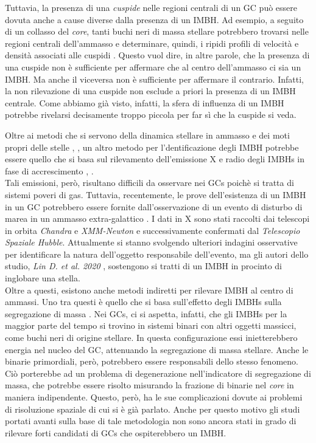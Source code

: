 Tuttavia, la presenza di una \textit{cuspide} nelle regioni centrali di un GC può essere dovuta anche a cause diverse dalla presenza di un IMBH. Ad esempio, a seguito di un collasso del \textit{core}, tanti buchi neri di massa stellare potrebbero trovarsi nelle regioni centrali dell'ammasso e determinare, quindi, i ripidi profili di velocità e densità associati alle cuspidi \cite{trenti:paper}. Questo vuol dire, in altre parole, che la presenza di una cuspide non è sufficiente per affermare che al centro dell'ammasso ci sia un IMBH. Ma anche il viceversa non è sufficiente per affermare il contrario. Infatti, la non rilevazione di una cuspide non esclude a priori la presenza di un IMBH centrale. Come abbiamo già visto, infatti, la sfera di influenza di un IMBH potrebbe rivelarsi decisamente troppo piccola per far sì che la cuspide si veda.

Oltre ai metodi che si servono della dinamica stellare in ammasso e dei moti propri delle stelle \cite{banwolf:paper}, \cite{gebh:paper}, un altro metodo per l'dentificazione degli IMBH potrebbe essere quello che si basa sul rilevamento dell'emissione X e radio degli IMBHs in fase di accrescimento \cite{mac1:paper}, \cite{mac2:paper}.\\
Tali emissioni, però, risultano difficili da osservare nei GCs poichè si tratta di sistemi poveri di gas. Tuttavia, recentemente, le prove dell'esistenza di un IMBH in un GC potrebbero essere fornite dall'osservazione di un evento di disturbo di marea in un ammasso extra-galattico \cite{lin:paper}. I dati in X sono stati raccolti dai telescopi in orbita \textit{Chandra} e \textit{XMM-Newton} e successivamente confermati dal \textit{Telescopio Spaziale Hubble}. Attualmente si stanno svolgendo ulteriori indagini osservative per identificare la natura dell'oggetto responsabile dell'evento, ma gli autori dello studio, \textit{Lin D. et al. 2020} \cite{lin_2020:paper}, sostengono si tratti di un IMBH in procinto di inglobare una stella.\\
\indent
Oltre a questi, esistono anche metodi indiretti per rilevare IMBH al centro di ammassi. Uno tra questi è quello che si basa sull'effetto degli IMBHs sulla segregazione di massa \cite{pasquato:paper}. Nei GCs, ci si aspetta, infatti, che gli IMBHs per la maggior parte del tempo si trovino in sistemi binari con altri oggetti massicci, come buchi neri di origine stellare. In questa configurazione essi inietterebbero energia nel nucleo del GC, attenuando la segregazione di massa stellare. Anche le binarie primordiali, però, potrebbero essere responsabili dello stesso fenomeno. Ciò porterebbe ad un problema di degenerazione nell'indicatore di segregazione di massa, che potrebbe essere risolto misurando la frazione di binarie nel \textit{core} in maniera indipendente. Questo, però, ha le sue complicazioni dovute ai problemi di risoluzione spaziale di cui si è già parlato. Anche per questo motivo gli studi portati avanti sulla base di tale metodologia non sono ancora stati in grado di rilevare forti candidati di GCs che ospiterebbero un IMBH.

